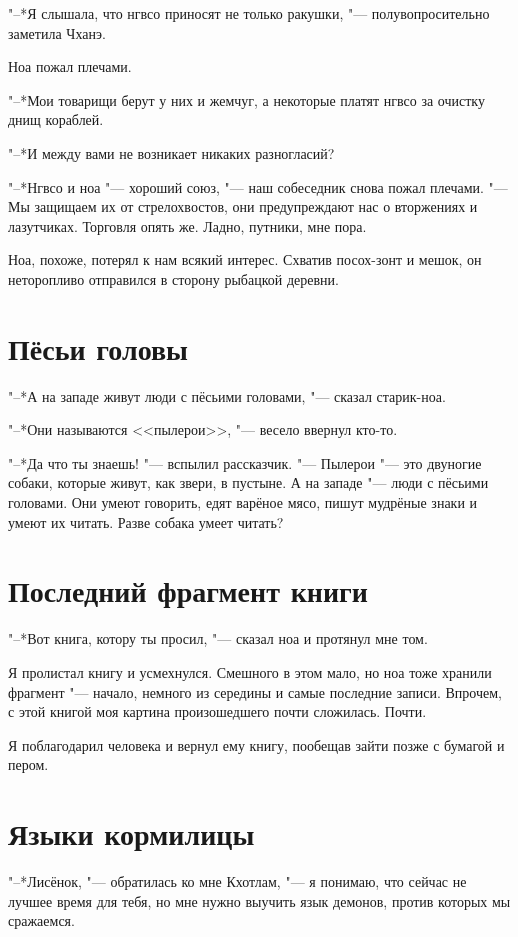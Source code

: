 \documentclass[a4paper,10pt,fleqn]{book}
\begin{document}
"--*Я слышала, что нгвсо приносят не только ракушки, "--- полувопросительно заметила Чханэ.

Ноа пожал плечами.

"--*Мои товарищи берут у них и жемчуг, а некоторые платят нгвсо за очистку днищ кораблей.

"--*И между вами не возникает никаких разногласий?

"--*Нгвсо и ноа "--- хороший союз, "--- наш собеседник снова пожал плечами.
"--- Мы защищаем их от стрелохвостов, они предупреждают нас о вторжениях и лазутчиках.
Торговля опять же.
Ладно, путники, мне пора.

Ноа, похоже, потерял к нам всякий интерес.
Схватив посох-зонт и мешок, он неторопливо отправился в сторону рыбацкой деревни.

\section{Пёсьи головы}

"--*А на западе живут люди с пёсьими головами, "--- сказал старик-ноа.

"--*Они называются <<пылерои>>, "--- весело ввернул кто-то.

"--*Да что ты знаешь! "--- вспылил рассказчик.
"--- Пылерои "--- это двуногие собаки, которые живут, как звери, в пустыне.
А на западе "--- люди с пёсьими головами.
Они умеют говорить, едят варёное мясо, пишут мудрёные знаки и умеют их читать.
Разве собака умеет читать?

\section{Последний фрагмент книги}

"--*Вот книга, котору ты просил, "--- сказал ноа и протянул мне том.

Я пролистал книгу и усмехнулся.
Смешного в этом мало, но ноа тоже хранили фрагмент "--- начало, немного из середины и самые последние записи.
Впрочем, с этой книгой моя картина произошедшего почти сложилась.
Почти.

Я поблагодарил человека и вернул ему книгу, пообещав зайти позже с бумагой и пером.

\section{Языки кормилицы}

"--*Лисёнок, "--- обратилась ко мне Кхотлам, "--- я понимаю, что сейчас не лучшее время для тебя, но мне нужно выучить язык демонов, против которых мы сражаемся.
\end{document}
